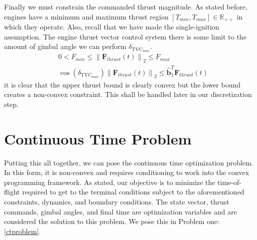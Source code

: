 Finally we must constrain the commanded thrust magnitude. As stated before, engines have a minimum and maximum thrust region $[T_{min}, T_{max}] \in \mathbb{R}_{++}$ in which they operate. Also, recall that we have made the single-ignition assumption. The engine thrust vector control system there is some limit to the amount of gimbal angle we can perform $\delta_{\text{TVC}_{max}}$.
\begin{align}
& 0 < F_{min} \leq \left \lVert \bm{F}_{thrust}(t) \right \lVert_2 \leq F_{max} \\
& \cos(\delta_{\text{TVC}_{max}}) \left \lVert \bm{F}_{thrust}(t) \right \lVert_2 \leq \hat{\bm{b}}_1^T \bm{F}_{thrust}(t)
\end{align}
it is clear that the upper thrust bound is clearly convex but the lower bound creates a non-convex constraint. This shall be handled later in our discretization step.

%
\section{Continuous Time Problem}
Putting this all together, we can pose the continuous time optimization problem. In this form, it is non-convex and requires conditioning to work into the convex programming framework. As stated, our objective is to minimize the time-of-flight required to get to the terminal conditions subject to the aforementioned constraints, dynamics, and boundary conditions. The state vector, thrust commands, gimbal angles, and final time are optimization variables and are considered the solution to this problem. We pose this in Problem one: \ref{ctproblem}.





